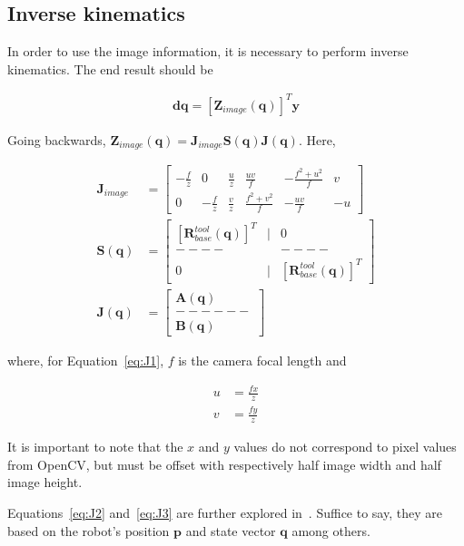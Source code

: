 \subsection{Inverse kinematics}
In order to use the image information, it is necessary to perform inverse kinematics.
The end result should be

\begin{align}
\mathrm{\textbf{dq}}=\left[\textbf{Z}_\mathit{image}(\textbf{q})\right]^T\textbf{y} %
\end{align}

Going backwards, $\textbf{Z}_\mathit{image}(\textbf{q}) = \textbf{J}_\mathit{image}\textbf{S}(\textbf{q})\textbf{J}(\textbf{q})$. Here,

\begin{align}
    \textbf{J}_\mathit{image}&=
    \left[
        \begin{matrix}
            -\frac{f}{z} & 0            & \frac{u}{z} & \frac{uv}{f}      & -\frac{f^2+u^2}{f} & v \\
            0            & -\frac{f}{z} & \frac{v}{z} & \frac{f^2+v^2}{f} & -\frac{uv}{f}      & -u
        \end{matrix}
    \right]\label{eq:J1}\\
    \textbf{S}(\textbf{q})&=\left[
    \begin{matrix}
        \left[\textbf{R}_\mathit{base}^\mathit{tool}(\textbf{q})\right]^T & | & 0 \\ %
        -- -- & & -- -- \\
        0 & | & \left[\textbf{R}_\mathit{base}^\mathit{tool}(\textbf{q})\right]^T %
    \end{matrix}
    \right]\label{eq:J2}\\
    \textbf{J}(\textbf{q})&=\left[
    \begin{matrix}
        \textbf{A}(\textbf{q})\\
        ------\\
        \textbf{B}(\textbf{q})
    \end{matrix}
    \right]\label{eq:J3}
\end{align}

where, for Equation~\ref{eq:J1}, $f$ is the camera focal length and

\begin{align}
u &= \frac{fx}{z}\nonumber \\
v &= \frac{fy}{z}
\end{align}

It is important to note that the $x$ and $y$ values do not correspond to pixel values from OpenCV, but must be offset with respectively half image width and half image height.

Equations~\ref{eq:J2} and~\ref{eq:J3} are further explored in~\cite{robbook}.
Suffice to say, they are based on the robot's position $\textbf{p}$ and state vector $\textbf{q}$ among others.
